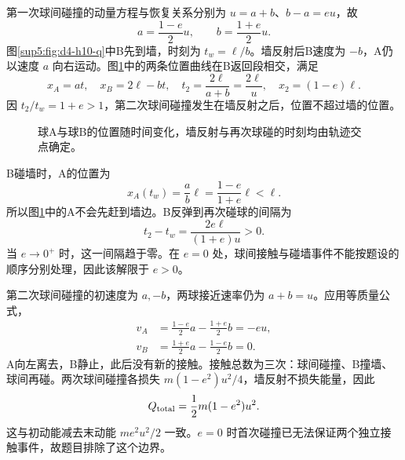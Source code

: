 \begin{solution}
第一次球间碰撞的动量方程与恢复关系分别为 $u=a+b$、$b-a=eu$，故
\begin{equation}
 a=\frac{1-e}{2}u,\qquad b=\frac{1+e}{2}u.
\end{equation}
图\ref{sup5:fig:d4-h10-q}中B先到墙，时刻为 $t_w=\ell/b$。墙反射后B速度为 $-b$，A仍以速度 $a$ 向右运动。图\ref{sup5:fig:d4-h10-s}中的两条位置曲线在B返回段相交，满足
\begin{equation}
 x_A=at,\quad x_B=2\ell-bt,\quad
 t_2=\frac{2\ell}{a+b}=\frac{2\ell}{u},\quad
 x_2=(1-e)\ell.
\end{equation}
因 $t_2/t_w=1+e>1$，第二次球间碰撞发生在墙反射之后，位置不超过墙的位置。
\begin{figure}[H]\centering
{}
\caption{球A与球B的位置随时间变化，墙反射与再次球碰的时刻均由轨迹交点确定。}\label{sup5:fig:d4-h10-s}
\end{figure}
B碰墙时，A的位置为
\[
x_A(t_w)=\frac ab\ell=\frac{1-e}{1+e}\ell<\ell.
\]
所以图\ref{sup5:fig:d4-h10-s}中的A不会先赶到墙边。B反弹到再次碰球的间隔为
\[
t_2-t_w=\frac{2e\ell}{(1+e)u}>0.
\]
当 $e\to0^+$ 时，这一间隔趋于零。在 $e=0$ 处，球间接触与碰墙事件不能按题设的顺序分别处理，因此该解限于 $e>0$。

第二次球间碰撞的初速度为 $a,-b$，两球接近速率仍为 $a+b=u$。应用等质量公式，
\begin{align}
 v_A&=\frac{1-e}{2}a-\frac{1+e}{2}b=-eu,\\
 v_B&=\frac{1+e}{2}a-\frac{1-e}{2}b=0.
\end{align}
A向左离去，B静止，此后没有新的接触。接触总数为三次：球间碰撞、B撞墙、球间再碰。两次球间碰撞各损失 $m(1-e^2)u^2/4$，墙反射不损失能量，因此
\begin{equation}
 Q_{\rm total}=\frac12m(1-e^2)u^2.
\end{equation}
这与初动能减去末动能 $me^2u^2/2$ 一致。$e=0$ 时首次碰撞已无法保证两个独立接触事件，故题目排除了这个边界。
\end{solution}


